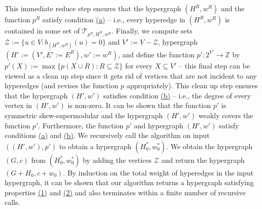 \documentclass{article}
\newcommand{\zeros}{\ensuremath{\mathcal{Z}}\xspace}
\providecommand{\Z}{\mathbb{Z}}
\begin{document}
This immediate reduce step ensures that the hypergraph $(H^R, w^R)$ and the function $p^R$ satisfy condition \hyperlink{WeakToStrong(a)}{(a)} -- i.e., every hyperedge in $(H^R, w^R)$ is contained in some set of $\mathcal{T}_{p^R, H^R, w^R}$. 
Finally, we compute sets $\zeros:=\{u\in V: b_{(H^R, w^R)}(u)=0\}$ and $V':=V-\zeros$, hypergraph $(H':=(V', E':=E^R), w':=w^R)$, and define the function $p':2^{V'}\rightarrow \Z$ by $p'(X):=\max\{p(X\cup R): R\subseteq \zeros\}$ for every $X\subseteq V'$ -- this final step can be viewed as a clean up step since it gets rid of vertices that are not incident to any hyperedges (and revises the function $p$ appropriately). 
This clean up step ensures that the hypergraph $(H', w')$ satisfies condition \hyperlink{WeakToStrong(b)}{(b)} -- i.e., the degree of every vertex in $(H', w')$ is non-zero. 
It can be shown that the function $p'$ is symmetric skew-supermodular and the hypergraph $(H', w')$ weakly covers the function $p'$. Furthermore, the function $p'$ and hypergraph $(H', w')$ satisfy conditions \hyperlink{WeakToStrong(a)}{(a)} and \hyperlink{WeakToStrong(b)}{(b)}. 
We recursively call the algorithm on input $((H', w'), p')$ to obtain a hypergraph $(H_0^*, w_0^*)$. We obtain the hypergraph $(G, c)$ from $(H_0^*, w_0^*)$ by adding the vertices $\zeros$ and return the hypergraph $(G+H_0, c+w_0)$.  
By induction on the total weight of hyperedges in the input hypergraph, it can be shown that our algorithm returns a hypergraph satisfying properties \hyperlink{WeakToStrong(1)}{(1)} and \hyperlink{WeakToStrong(2)}{(2)} and also terminates within a finite number of recursive calls. 
\end{document}
